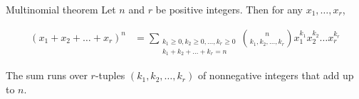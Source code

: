         \begin{theorem}{Multinomial theorem}
            Let $n$ and $r$ be positive integers. Then for any $x_1, \dots, x_r$,

            \begin{align*}
                (x_1 + x_2 + \dots + x_r)^n &= \sum_{\substack{k_1 \geq 0,k_2 \geq 0,\dots, k_r \geq 0 \\ k_1 + k_2 + \dots + k_r = n}} \binom{n}{k_1,k_2,\dots,k_r} x_1^{k_1}x_2^{k_2}\dots x_r^{k_r}
            \end{align*}

            The sum runs over $r$-tuples $(k_1, k_2, \dots, k_r)$ of nonnegative integers that add up to $n$.
        \end{theorem}